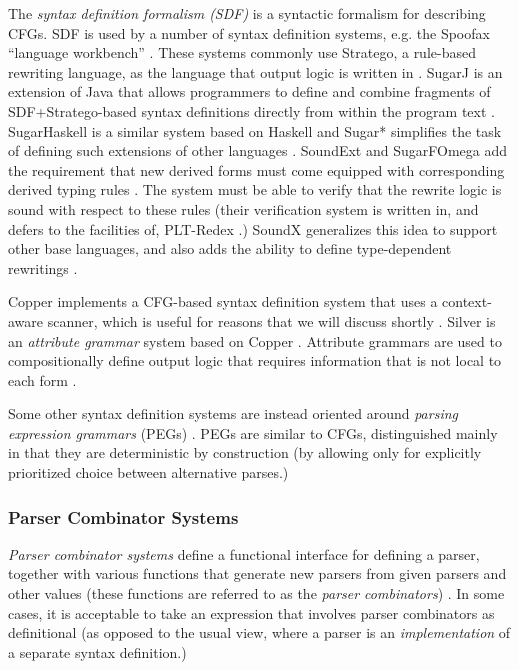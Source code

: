 The \emph{syntax definition formalism  (SDF)}  \cite{journals/sigplan/HeeringHKR89} is a syntactic formalism for describing CFGs. SDF is used by a number of syntax definition systems, e.g. the Spoofax ``language workbench'' \cite{kats2010spoofax}. These systems commonly use Stratego, a rule-based rewriting language, as the language that output logic is written in \cite{Visser-RTA01}. SugarJ is an extension of Java that allows programmers to define and combine fragments of SDF+Stratego-based syntax definitions directly from within the program text \cite{erdweg2011sugarj}. SugarHaskell is a similar system based on Haskell \cite{erdweg2012layout} and Sugar* simplifies the task of defining such extensions of other languages \cite{erdweg2013framework}. SoundExt and SugarFOmega add the requirement that new derived forms must come equipped with corresponding derived typing rules \cite{conf/icfp/LorenzenE13}. The system must be able to verify that the rewrite logic is sound with respect to these rules (their verification system is written in, and defers to the facilities of, PLT-Redex \cite{Felleisen-Findler-Flatt09}.) SoundX generalizes this idea to support other base languages, and also adds the ability to define type-dependent rewritings \cite{conf/popl/LorenzenE16}.


Copper implements a CFG-based syntax definition system that uses a context-aware scanner, which is useful for reasons that we will discuss shortly \cite{conf/gpce/WykS07}. Silver is an \emph{attribute grammar} system based on Copper \cite{VanWyk:2010:SEA}. Attribute grammars are used to compositionally define output logic that requires information that is not local to each form \cite{knuth1968semantics}.


Some other syntax definition systems are instead oriented  around \emph{parsing expression grammars} (PEGs) \cite{Ford04a}. PEGs are similar to CFGs, distinguished mainly in that they are deterministic by construction (by allowing only for explicitly prioritized choice between alternative parses.)

\subsubsection{Parser Combinator Systems}
\emph{Parser combinator systems} define a functional interface for defining a parser, together with various functions that generate new parsers from given parsers and other values (these functions are referred to as the \emph{parser combinators}) \cite{Hutton1992d}. In some cases, it is acceptable to take an expression that involves parser combinators as definitional (as opposed to the usual view, where a parser is an \emph{implementation} of a separate syntax definition.) 

